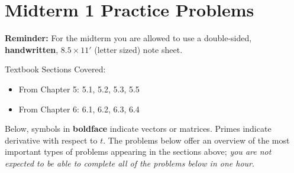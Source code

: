 \documentclass[11pt]{article}
\title{$1}
\author{Nikolas Eptaminitakis}
\begin{document}
\section*{Midterm 1 Practice Problems}

\noindent\textbf{Reminder:} For the midterm you are allowed to use a double-sided, \textbf{handwritten}, $8.5\times11'$ (letter sized)  note  sheet. 

Textbook Sections Covered: 
\begin{itemize}
    \item From Chapter 5: 5.1, 5.2, 5.3, 5.5
    \item From Chapter 6: 6.1, 6.2, 6.3, 6.4
\end{itemize}



\noindent Below, symbols in \textbf{boldface} indicate vectors or matrices. Primes indicate derivative with respect to $t$. The problems below offer an overview of the most important types of problems appearing in the sections above; \textit{you are not expected to be able to complete all of the problems below in one hour}.
\end{document}
